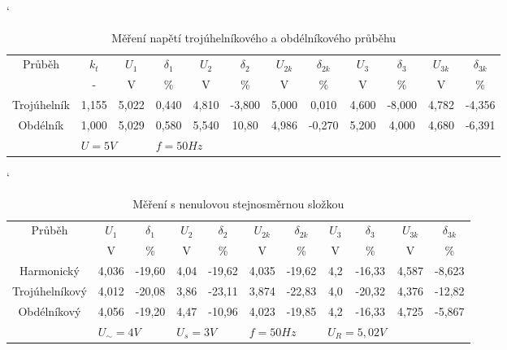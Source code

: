 \documentclass[a4paper, czech]{article}
\begin{document}
\begin{table}[H]
    \catcode`
    \centering
    \caption{Měření napětí trojúhelníkového a obdélníkového průběhu}
    \begin{tabular}{cccccccccccc}
        \toprule
        \multirow{2}{*}{Průběh} & $k_t$    & $U_1$    & $\delta_1$    & $U_2$    & $\delta_2$     & $U_{2k}$   & $\delta_{2k}$    & $U_3$    & $\delta_3$     & $U_{3k}$   & $\delta_{3k}$    \\
        \cmidrule(rl){2-2}
        \cmidrule(rl){3-4}
        \cmidrule(rl){5-8}
        \cmidrule(rl){9-12}
                                & -     & V     & \%    & V     & \%     & V     & \%     & V     & \%     & V     & \%     \\
        \midrule
        Trojúhelník             & 1,155 & 5,022 & 0,440 & 4,810 & -3,800 & 5,000 & 0,010  & 4,600 & -8,000 & 4,782 & -4,356 \\
        Obdélník                & 1,000 & 5,029 & 0,580 & 5,540 & 10,80  & 4,986 & -0,270 & 5,200 & 4,000  & 4,680 & -6,391 \\
        \bottomrule
        &\multicolumn{2}{l}{$U = 5V$} & \multicolumn{2}{l}{$f = 50 Hz$}
    \end{tabular}
\end{table}

\begin{table}[H]
    \catcode`
    \centering
    \caption{Měření s nenulovou stejnosměrnou složkou}
    \begin{tabular}{ccccccccccc}
        \toprule
        \multirow{2}{*}{Průběh} & $U_1$    & $\delta_1$    & $U_2$    & $\delta_2$     & $U_{2k}$   & $\delta_{2k}$    & $U_3$    & $\delta_3$     & $U_{3k}$   & $\delta_{3k}$    \\
        \cmidrule(rl){2-3}
        \cmidrule(rl){4-7}
        \cmidrule(rl){8-11}
                                & V     & \%     & V    & \%     & V     & \%     & V   & \%     & V     & \%     \\
        \midrule
        Harmonický              & 4,036 & -19,60 & 4,04 & -19,62 & 4,035 & -19,62 & 4,2 & -16,33 & 4,587 & -8,623 \\
        Trojúhelníkový          & 4,012 & -20,08 & 3,86 & -23,11 & 3,874 & -22,83 & 4,0 & -20,32 & 4,376 & -12,82 \\
        Obdélníkový             & 4,056 & -19,20 & 4,47 & -10,96 & 4,023 & -19,85 & 4,2 & -16,33 & 4,725 & -5,867 \\
        \bottomrule
        &\multicolumn{2}{l}{$U_{\sim} = 4V$} & \multicolumn{2}{l}{$U_s = 3V$} & \multicolumn{2}{l}{$f = 50 Hz$} & \multicolumn{2}{l}{$U_R = 5,02V$}
    \end{tabular}
\end{table}
\end{document}
